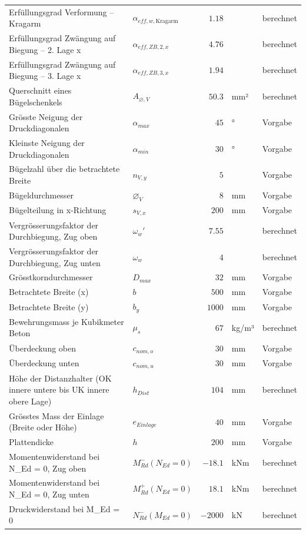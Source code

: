 \documentclass[11pt,a4paper]{article}
\begin{document}
\begin{xltabular}{\linewidth}{>{\raggedright\arraybackslash}Xlrll}
Erfüllungsgrad Verformung – Kragarm & $\alpha_{eff,w,\text{Kragarm}}$ & $1.18$ &  & berechnet \\
Erfüllungsgrad Zwängung auf Biegung – 2. Lage x & $\alpha_{eff,ZB,2,x}$ & $4.76$ &  & berechnet \\
Erfüllungsgrad Zwängung auf Biegung – 3. Lage x & $\alpha_{eff,ZB,3,x}$ & $1.94$ &  & berechnet \\
Querschnitt eines Bügelschenkels & $A_{\varnothing,V}$ & $50.3$ & mm² & berechnet \\
Grösste Neigung der Druckdiagonalen & $\alpha_{max}$ & $45$ & ° & Vorgabe \\
Kleinste Neigung der Druckdiagonalen & $\alpha_{min}$ & $30$ & ° & Vorgabe \\
Bügelzahl über die betrachtete Breite & $n_{V,y}$ & $5$ &  & Vorgabe \\
Bügeldurchmesser & $\varnothing_{V}$ & $8$ & mm & Vorgabe \\
Bügelteilung in x-Richtung & $s_{V,x}$ & $200$ & mm & Vorgabe \\
Vergrösserungsfaktor der Durchbiegung, Zug oben & $\omega_w'$ & $7.55$ &  & berechnet \\
Vergrösserungsfaktor der Durchbiegung, Zug unten & $\omega_w$ & $4$ &  & berechnet \\
Grösstkorndurchmesser & $D_{max}$ & $32$ & mm & Vorgabe \\
Betrachtete Breite (x) & $b$ & $500$ & mm & Vorgabe \\
Betrachtete Breite (y) & $b_y$ & $1000$ & mm & Vorgabe \\
Bewehrungsmass je Kubikmeter Beton & $\mu_s$ & $67$ & kg/m³ & berechnet \\
Überdeckung oben & $c_{nom,o}$ & $30$ & mm & Vorgabe \\
Überdeckung unten & $c_{nom,u}$ & $30$ & mm & Vorgabe \\
Höhe der Distanzhalter (OK innere untere bis UK innere obere Lage) & $h_{Dist}$ & $104$ & mm & berechnet \\
Grösstes Mass der Einlage (Breite oder Höhe) & $e_{Einlage}$ & $40$ & mm & Vorgabe \\
Plattendicke & $h$ & $200$ & mm & Vorgabe \\
Momentenwiderstand bei N\_Ed = 0, Zug oben & $M_{Rd}^{-}(N_{Ed} = 0)$ & $-18.1$ & kNm & berechnet \\
Momentenwiderstand bei N\_Ed = 0, Zug unten & $M_{Rd}^{+}(N_{Ed} = 0)$ & $18.1$ & kNm & berechnet \\
Druckwiderstand bei M\_Ed = 0 & $N_{Rd}^{-}(M_{Ed} = 0)$ & $-2000$ & kN & berechnet \\

\end{xltabular}
\end{document}
